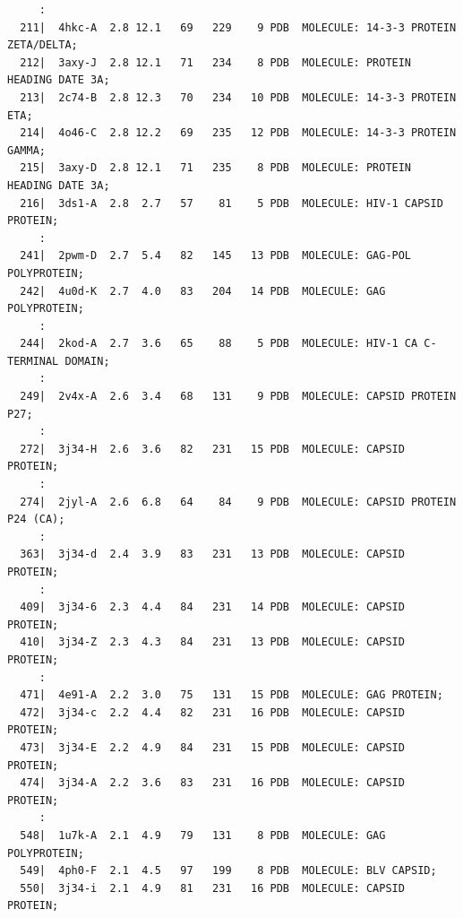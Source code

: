 \documentclass{bmcart}
\begin{document}
\begin{verbatim}
     :
  211|  4hkc-A  2.8 12.1   69   229    9 PDB  MOLECULE: 14-3-3 PROTEIN ZETA/DELTA;                                 
  212|  3axy-J  2.8 12.1   71   234    8 PDB  MOLECULE: PROTEIN HEADING DATE 3A;                                   
  213|  2c74-B  2.8 12.3   70   234   10 PDB  MOLECULE: 14-3-3 PROTEIN ETA;                                        
  214|  4o46-C  2.8 12.2   69   235   12 PDB  MOLECULE: 14-3-3 PROTEIN GAMMA;                                      
  215|  3axy-D  2.8 12.1   71   235    8 PDB  MOLECULE: PROTEIN HEADING DATE 3A;                                   
  216|  3ds1-A  2.8  2.7   57    81    5 PDB  MOLECULE: HIV-1 CAPSID PROTEIN;                                      
     :
  241|  2pwm-D  2.7  5.4   82   145   13 PDB  MOLECULE: GAG-POL POLYPROTEIN;                                       
  242|  4u0d-K  2.7  4.0   83   204   14 PDB  MOLECULE: GAG POLYPROTEIN;                                           
     :
  244|  2kod-A  2.7  3.6   65    88    5 PDB  MOLECULE: HIV-1 CA C-TERMINAL DOMAIN;                                
     :
  249|  2v4x-A  2.6  3.4   68   131    9 PDB  MOLECULE: CAPSID PROTEIN P27;                                        
     :
  272|  3j34-H  2.6  3.6   82   231   15 PDB  MOLECULE: CAPSID PROTEIN;                                            
     :
  274|  2jyl-A  2.6  6.8   64    84    9 PDB  MOLECULE: CAPSID PROTEIN P24 (CA);                                   
     :
  363|  3j34-d  2.4  3.9   83   231   13 PDB  MOLECULE: CAPSID PROTEIN;                                            
     :
  409|  3j34-6  2.3  4.4   84   231   14 PDB  MOLECULE: CAPSID PROTEIN;                                            
  410|  3j34-Z  2.3  4.3   84   231   13 PDB  MOLECULE: CAPSID PROTEIN;                                            
     :
  471|  4e91-A  2.2  3.0   75   131   15 PDB  MOLECULE: GAG PROTEIN;                                               
  472|  3j34-c  2.2  4.4   82   231   16 PDB  MOLECULE: CAPSID PROTEIN;                                            
  473|  3j34-E  2.2  4.9   84   231   15 PDB  MOLECULE: CAPSID PROTEIN;                                            
  474|  3j34-A  2.2  3.6   83   231   16 PDB  MOLECULE: CAPSID PROTEIN;                                            
     :
  548|  1u7k-A  2.1  4.9   79   131    8 PDB  MOLECULE: GAG POLYPROTEIN;                                           
  549|  4ph0-F  2.1  4.5   97   199    8 PDB  MOLECULE: BLV CAPSID;                                                
  550|  3j34-i  2.1  4.9   81   231   16 PDB  MOLECULE: CAPSID PROTEIN;                                            
\end{verbatim}
\end{document}
